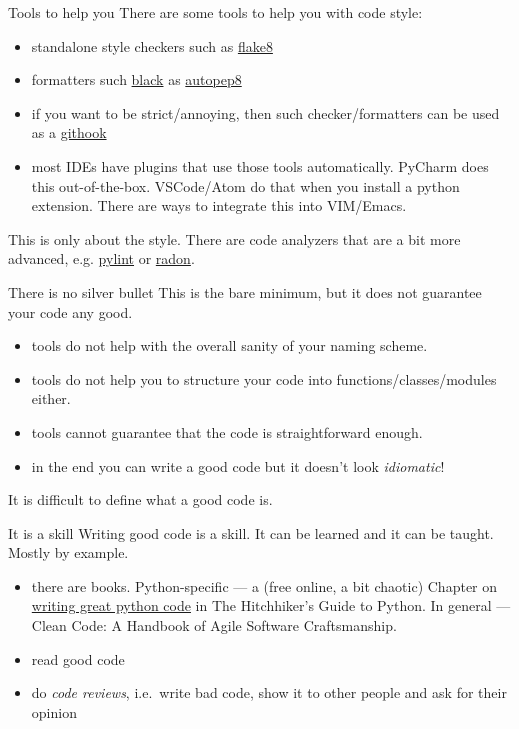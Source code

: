 \documentclass[compress,english,aspectratio=1610]{beamer}
\let\olditem\item
\renewcommand{\item}{\setlength{\itemsep}{\fill}\olditem}
\begin{document}
\begin{frame}{Tools to help you}
  There are some tools to help you with code style:
  \begin{itemize}
  	\item standalone style checkers such as \href{http://flake8.pycqa.org/en/latest/}{flake8}
  	\item formatters such \href{https://github.com/psf/black}{black} as \href{https://pypi.org/project/autopep8/0.8/}{autopep8}
  	\item if you want to be strict/annoying, then such checker/formatters can be used as a \href{https://git-scm.com/docs/githooks}{githook}
  	\item most IDEs have plugins that use those tools automatically. PyCharm does this out-of-the-box. VSCode/Atom do that when you install a python extension. There are ways to integrate this into VIM/Emacs.
  \end{itemize}
\end{frame}

\begin{frame}
  This is only about the style.
  \vskip 1cm
  There are code analyzers that are a bit more advanced, e.g. \href{https://pylint.org/}{pylint} or \href{https://pypi.org/project/radon/}{radon}.
\end{frame}

\begin{frame}{There is no silver bullet}
  This is the bare minimum, but it does not guarantee your code any good.
  \begin{itemize}
  \item tools do not help with the overall sanity of your naming scheme.
  \item tools do not help you to structure your code into functions/classes/modules either.
  \item tools cannot guarantee that the code is straightforward enough.
  \item in the end you can write a good code but it doesn't look \textit{idiomatic}!
  \end{itemize}
\end{frame}

\begin{frame}
  \centering
  It is difficult to define what a good code is.
\end{frame}

\begin{frame}{It is a skill}
  Writing good code is a skill. It can be learned and it can be taught. Mostly by example.
  \begin{itemize}
  \item there are books. Python-specific --- a (free online, a bit chaotic) Chapter on \href{https://docs.python-guide.org/\#writing-great-python-code}{writing great python code} in The Hitchhiker's Guide to Python. In general --- Clean Code: A Handbook of Agile Software Craftsmanship.
  \item read good code
  \item do \textit{code reviews}, i.e.~write bad code, show it to other people and ask for their opinion
  \end{itemize}
\end{frame}
\end{document}
